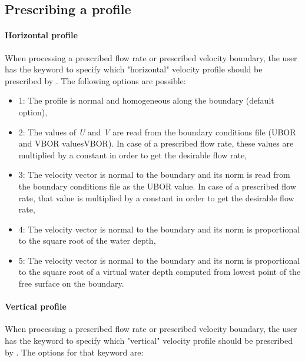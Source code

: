 \subsection{Prescribing a profile}


\paragraph{Horizontal profile}

When processing a prescribed flow rate or prescribed velocity boundary, the
user has the keyword  to specify which "horizontal"
velocity profile should be prescribed by . The following options are
possible:

\begin{itemize}
\item 1: The profile is normal and homogeneous along the boundary (default
option),

\item 2: The values of \textit{U} and \textit{V} are read from the boundary
conditions file (UBOR and VBOR valuesVBOR). In case of a prescribed flow
rate, these values are multiplied by a constant in order to get the desirable
flow rate,

\item 3: The velocity vector is normal to the boundary and its norm is read
from the boundary conditions file as the UBOR value. In case of a
prescribed flow rate, that value is multiplied by a constant in order to get
the desirable flow rate,

\item 4: The velocity vector is normal to the boundary and its norm is
proportional to the square root of the water depth,

\item 5: The velocity vector is normal to the boundary and its norm is
proportional to the square root of a virtual water depth computed from lowest
point of the free surface on the boundary.
\end{itemize}

\paragraph{ Vertical profile}

When processing a prescribed flow rate or prescribed velocity boundary, the
user has the keyword  to specify which
"vertical" velocity profile should be prescribed by . The options for
that keyword are:


